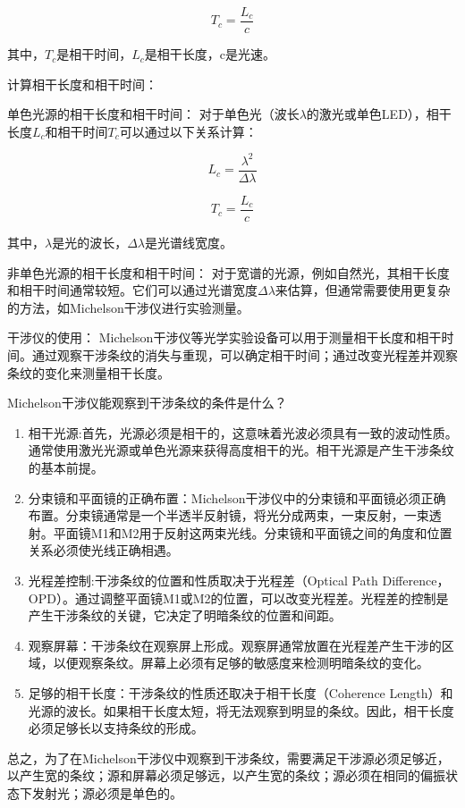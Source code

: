 \documentclass[dvipsnames, svgnames,a4paper,11pt]{article}
\begin{document}
	\[T_{c} = \frac{L_{c}}{c}\]
	
	其中，$T_{c}$是相干时间，$L_{c}$是相干长度，c是光速。
	
	计算相干长度和相干时间：
	
	
	单色光源的相干长度和相干时间： 对于单色光（波长$\lambda$的激光或单色LED），相干长度$L_{c}$和相干时间$T_{c}$可以通过以下关系计算：
	
	\[L_{c} = \frac{\lambda^{2}}{\Delta\lambda}\]
	
	\[T_{c} = \frac{L_{c}}{c}\]
	
	其中，$\lambda$是光的波长，$\Delta\lambda$是光谱线宽度。
	
	非单色光源的相干长度和相干时间： 对于宽谱的光源，例如自然光，其相干长度和相干时间通常较短。它们可以通过光谱宽度$\Delta\lambda$来估算，但通常需要使用更复杂的方法，如Michelson干涉仪进行实验测量。
	
	干涉仪的使用： Michelson干涉仪等光学实验设备可以用于测量相干长度和相干时间。通过观察干涉条纹的消失与重现，可以确定相干时间；通过改变光程差并观察条纹的变化来测量相干长度。
	
	\begin{question}
		Michelson干涉仪能观察到干涉条纹的条件是什么？
	\end{question}	
	
	\begin{enumerate}
		\item 相干光源:首先，光源必须是相干的，这意味着光波必须具有一致的波动性质。通常使用激光光源或单色光源来获得高度相干的光。相干光源是产生干涉条纹的基本前提。
		\item 分束镜和平面镜的正确布置：Michelson干涉仪中的分束镜和平面镜必须正确布置。分束镜通常是一个半透半反射镜，将光分成两束，一束反射，一束透射。平面镜M1和M2用于反射这两束光线。分束镜和平面镜之间的角度和位置关系必须使光线正确相遇。
		\item 光程差控制:干涉条纹的位置和性质取决于光程差（Optical Path Difference，OPD）。通过调整平面镜M1或M2的位置，可以改变光程差。光程差的控制是产生干涉条纹的关键，它决定了明暗条纹的位置和间距。
		\item 观察屏幕：干涉条纹在观察屏上形成。观察屏通常放置在光程差产生干涉的区域，以便观察条纹。屏幕上必须有足够的敏感度来检测明暗条纹的变化。
		\item 足够的相干长度：干涉条纹的性质还取决于相干长度（Coherence Length）和光源的波长。如果相干长度太短，将无法观察到明显的条纹。因此，相干长度必须足够长以支持条纹的形成。
	\end{enumerate}
	总之，为了在Michelson干涉仪中观察到干涉条纹，需要满足干涉源必须足够近，以产生宽的条纹；源和屏幕必须足够远，以产生宽的条纹；源必须在相同的偏振状态下发射光；源必须是单色的。
	
\end{document}
